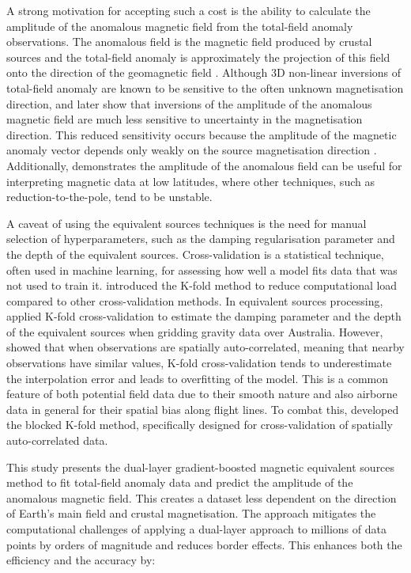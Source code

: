 A strong motivation for accepting such a cost is the ability to calculate the amplitude of the anomalous magnetic field from the total-field anomaly observations. The anomalous field is the magnetic field produced by crustal sources and the total-field anomaly is approximately the projection of this field onto the direction of the geomagnetic field \citep{Blakley1995}. Although 3D non-linear inversions of total-field anomaly are known to be sensitive to the often unknown magnetisation direction, \citet{Li2010_remanent} and later \citet{HidalgoGato2021} show that inversions of the amplitude of the anomalous magnetic field are much less sensitive to uncertainty in the magnetisation direction. This reduced sensitivity occurs because the amplitude of the magnetic anomaly vector depends only weakly on the source magnetisation direction \citep{Nabighian1984, Haney2003}. Additionally, \citet{Melo2021} demonstrates the amplitude of the anomalous field can be useful for interpreting magnetic data at low latitudes, where other techniques, such as reduction-to-the-pole, tend to be unstable.

A caveat of using the equivalent sources techniques is the need for manual selection of hyperparameters, such as the damping regularisation parameter and the depth of the equivalent sources. Cross-validation is a statistical technique, often used in machine learning, for assessing how well a model fits data that was not used to train it. \citet{Geisser1975} introduced the K-fold method to reduce computational load compared to other cross-validation methods. In equivalent sources processing, \citet{Soler2021} applied K-fold cross-validation to estimate the damping parameter and the depth of the equivalent sources when gridding gravity data over Australia. However, \citet{Roberts2017} showed that when observations are spatially auto-correlated, meaning that nearby observations have similar values, K-fold cross-validation tends to underestimate the interpolation error and leads to overfitting of the model. This is a common feature of both potential field data due to their smooth nature and also airborne data in general for their spatial bias along flight lines. To combat this, \citet{Roberts2017} developed the blocked K-fold method, specifically designed for cross-validation of spatially auto-correlated data.

This study presents the dual-layer gradient-boosted magnetic equivalent sources method to fit total-field anomaly data and predict the amplitude of the anomalous magnetic field. This creates a dataset less dependent on the direction of Earth’s main field and crustal magnetisation. The approach mitigates the computational challenges of applying a dual-layer approach to millions of data points by orders of magnitude and reduces border effects. This enhances both the efficiency and the accuracy by:

